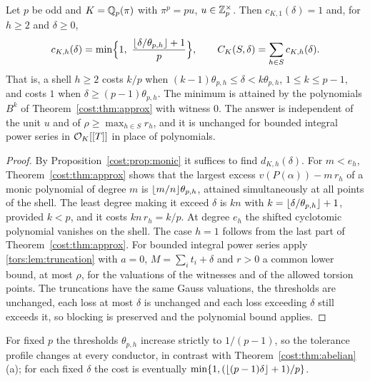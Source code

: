 \begin{theorem}\label{cost:thm:radical}
Let $p$ be odd and $K=\mathbb{Q}_p(\pi)$ with $\pi^p=pu$, $u\in\mathbb{Z}_p^\times$. Then $c_{K,1}(\delta)=1$
and, for $h\ge2$ and $\delta\ge0$,
\[
 c_{K,h}(\delta)=\min\Bigl\{1,\ \frac{\floor{\delta/\theta_{p,h}}+1}p\Bigr\},
 \qquad C_K(S,\delta)=\sum_{h\in S}c_{K,h}(\delta).
\]
That is, a shell $h\ge2$ costs $k/p$ when
$(k-1)\theta_{p,h}\le\delta<k\theta_{p,h}$, $1\le k\le p-1$, and costs $1$ when
$\delta\ge(p-1)\theta_{p,h}$. The minimum is attained by the polynomials $B^k$ of
Theorem~\ref{cost:thm:approx} with witness $0$. The answer is independent of the unit $u$ and of
$\rho\ge\max_{h\in S}r_h$, and it is unchanged for bounded integral power series in
$\mathcal{O}_K[[T]]$ in place of polynomials.
\end{theorem}

\begin{proof}
By Proposition~\ref{cost:prop:monic} it suffices to find $d_{K,h}(\delta)$. For $m<e_h$,
Theorem~\ref{cost:thm:approx} shows that the largest excess $v(P(\alpha))-m\,r_h$ of a monic
polynomial of degree $m$ is $\lfloor m/n\rfloor\theta_{p,h}$, attained simultaneously at all
points of the shell. The least degree making it exceed $\delta$ is $kn$ with
$k=\lfloor\delta/\theta_{p,h}\rfloor+1$, provided $k<p$, and it costs $kn\,r_h=k/p$. At degree
$e_h$ the shifted cyclotomic polynomial vanishes on the shell. The case $h=1$ follows from
the last part of Theorem~\ref{cost:thm:approx}. For bounded integral power series apply
\cref{tors:lem:truncation} with $a=0$, $M=\sum_it_i+\delta$ and $r>0$ a common lower bound,
at most $\rho$, for the valuations of the witnesses and of the allowed torsion points. The
truncations have the same Gauss valuations, the thresholds are unchanged, each loss at most
$\delta$ is unchanged and each loss exceeding $\delta$ still exceeds it, so blocking is
preserved and the polynomial bound applies.
\end{proof}

For fixed $p$ the thresholds $\theta_{p,h}$ increase strictly to $1/(p-1)$, so the
tolerance profile changes at every conductor, in contrast with
Theorem~\ref{cost:thm:abelian}(a); for each fixed $\delta$ the cost is eventually
$\min\{1,(\lfloor(p-1)\delta\rfloor+1)/p\}$.

